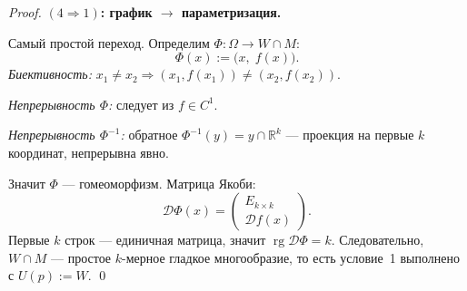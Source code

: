 \begin{proof}
  \medskip
  \textbf{$(4 \Rightarrow 1)$: график $\to$ параметризация.}

  Самый простой переход. Определим $\Phi: \Omega \to W \cap M$:
  \[
    \Phi(x) := \bigl(x,\; f(x)\bigr).
  \]
  \textit{Биективность:} $x_1 \neq x_2 \Rightarrow
  (x_1, f(x_1)) \neq (x_2, f(x_2))$.

  \textit{Непрерывность $\Phi$:} следует из $f \in C^1$.

  \textit{Непрерывность $\Phi^{-1}$:} обратное $\Phi^{-1}(y) =
  y \cap \mathbb{R}^k$ --- проекция на первые $k$ координат,
  непрерывна явно.

  Значит $\Phi$ --- гомеоморфизм. Матрица Якоби:
  \[
    \mathcal{D}\Phi(x) =
    \begin{pmatrix} E_{k\times k} \\ \mathcal{D}f(x) \end{pmatrix}.
  \]
  Первые $k$ строк --- единичная матрица, значит
  $\operatorname{rg}\mathcal{D}\Phi = k$.
  Следовательно, $W \cap M$ --- простое $k$-мерное гладкое
  многообразие, то есть условие~1 выполнено с $U(p) := W$. \qed
\end{proof}




